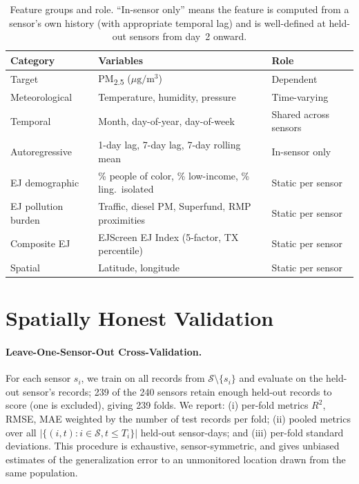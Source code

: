 \documentclass{article}
\begin{document}
\begin{table}[t]
\caption{Feature groups and role. ``In-sensor only'' means the feature is computed from a sensor's own history (with appropriate temporal lag) and is well-defined at held-out sensors from day~2 onward.}
\label{tab:features}
\centering
\small
\begin{tabular}{lll}
\toprule
\textbf{Category} & \textbf{Variables} & \textbf{Role} \\
\midrule
Target                 & PM\textsubscript{2.5} ($\mu\mathrm{g}/\mathrm{m}^3$) & Dependent \\
Meteorological         & Temperature, humidity, pressure                      & Time-varying \\
Temporal               & Month, day-of-year, day-of-week                       & Shared across sensors \\
Autoregressive         & 1-day lag, 7-day lag, 7-day rolling mean              & In-sensor only \\
EJ demographic         & \% people of color, \% low-income, \% ling.\ isolated & Static per sensor \\
EJ pollution burden    & Traffic, diesel PM, Superfund, RMP proximities        & Static per sensor \\
Composite EJ           & EJScreen EJ Index (5-factor, TX percentile)           & Static per sensor \\
Spatial                & Latitude, longitude                                   & Static per sensor \\
\bottomrule
\end{tabular}
\end{table}

\section{Spatially Honest Validation}
\label{sec:validation}

\paragraph{Leave-One-Sensor-Out Cross-Validation.} For each sensor $s_i$, we train on all records from $\mathcal{S}\setminus\{s_i\}$ and evaluate on the held-out sensor's records; 239 of the 240 sensors retain enough held-out records to score (one is excluded), giving 239 folds. We report: (i) per-fold metrics $R^2$, RMSE, MAE weighted by the number of test records per fold; (ii) pooled metrics over all $|\{(i,t) : i \in \mathcal{S}, t \leq T_i\}|$ held-out sensor-days; and (iii) per-fold standard deviations. This procedure is exhaustive, sensor-symmetric, and gives unbiased estimates of the generalization error to an unmonitored location drawn from the same population.
\end{document}
